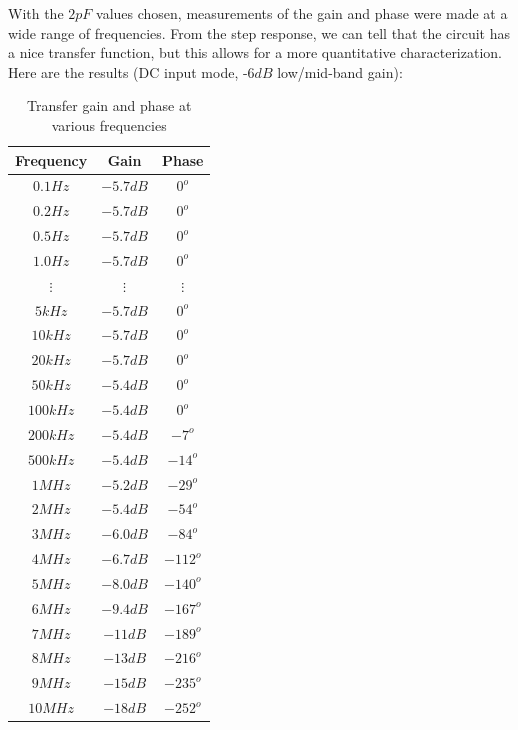 With the $2pF$ values chosen, measurements of the gain and phase were made at a wide range of frequencies. From the step response, we can tell that the circuit has a nice transfer function, but this allows for a more quantitative characterization. Here are the results (DC input mode, -$6dB$ low/mid-band gain):

\begin{table}[ht!]
	\begin{center}
	\caption{Transfer gain and phase at various frequencies}
	\begin{tabular}{|c|c|c|}
		\hline
		Frequency & Gain & Phase \\ \hline
		$0.1Hz$ & $-5.7 dB$ & $0^o$ \\ \hline
		$0.2Hz$ & $-5.7 dB$ & $0^o$ \\ \hline
		$0.5Hz$ & $-5.7 dB$ & $0^o$ \\ \hline
		$1.0Hz$ & $-5.7 dB$ & $0^o$ \\ \hline
		$\vdots$ & $\vdots$ & $\vdots$ \\ \hline
		$5kHz$ & $-5.7 dB$ & $0^o$ \\ \hline
		$10kHz$ & $-5.7 dB$ & $0^o$ \\ \hline
		$20kHz$ & $-5.7 dB$ & $0^o$ \\ \hline
		$50kHz$ & $-5.4 dB$ & $0^o$ \\ \hline
		$100kHz$ & $-5.4 dB$ & $0^o$ \\ \hline
		$200kHz$ & $-5.4 dB$ & $-7^o$ \\ \hline
		$500kHz$ & $-5.4 dB$ & $-14^o$ \\ \hline
		$1MHz$ & $-5.2 dB$ & $-29^o$ \\ \hline
		$2MHz$ & $-5.4 dB$ & $-54^o$ \\ \hline
		$3MHz$ & $-6.0 dB$ & $-84^o$ \\ \hline
		$4MHz$ & $-6.7 dB$ & $-112^o$ \\ \hline
		$5MHz$ & $-8.0 dB$ & $-140^o$ \\ \hline
		$6MHz$ & $-9.4 dB$ & $-167^o$ \\ \hline
		$7MHz$ & $-11 dB$ & $-189^o$ \\ \hline
		$8MHz$ & $-13 dB$ & $-216^o$ \\ \hline
		$9MHz$ & $-15 dB$ & $-235^o$ \\ \hline
		$10MHz$ & $-18 dB$ & $-252^o$ \\ \hline
	\end{tabular}
	\end{center}
\end{table}

